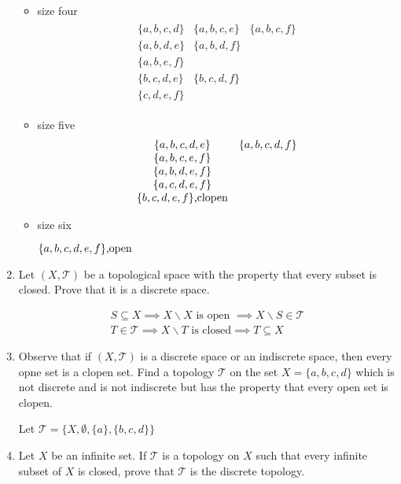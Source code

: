 \documentclass[10pt,a4paper]{report}
\newcommand{\TT}{\mathcal{T}}
\begin{document}
\begin{enumerate}
\begin{itemize}
	\item size four
	\begin{align*}
		\begin{array}{ccc}
			\{a,b,c,d\} & \{a,b,c,e\} & \{a,b,c,f\}\\
			\{a,b,d,e\} & \{a,b,d,f\}\\
			\{a,b,e,f\}\\
			\{b,c,d,e\} & \{b,c,d,f\}\\
			\{c,d,e,f\}
		\end{array}
	\end{align*}
	
	\item size five
	\begin{align*}
		\begin{array}{cc}
			\{a,b,c,d,e\} & \{a,b,c,d,f\} \\
			\{a,b,c,e,f\}\\
			\{a,b,d,e,f\}\\
			\{a,c,d,e,f\}\\
			\{b,c,d,e,f\}\text{,clopen}
		\end{array}
	\end{align*}
	
	\item size six
	
		$\{a,b,c,d,e,f\}\text{,open}$
\end{itemize}

\newpage
\item Let $(X,\TT)$ be a topological space with the property that every subset is closed.  Prove that it is a discrete space.

\begin{align*}
	S \subseteq X \implies X\backslash X \text{ is open } \implies X\backslash S \in \TT \\
	T \in \TT \implies X\backslash T \text{ is closed} \implies T \subseteq X
\end{align*}

\item Observe that if $(X,\TT)$ is a discrete space or an indiscrete space, then every opne set is a clopen set.  Find a topology $\TT$ on the set $X=\{a,b,c,d\}$ which is not discrete and is not indiscrete but has the property that every open set is clopen.

Let $\TT = \{X, \emptyset, \{a\}, \{b,c,d\}\}$

\item Let $X$ be an infinite set.  If $\TT$ is a topology on $X$ such that every infinite subset of $X$ is closed, prove that $\TT$ is the discrete topology.


\end{enumerate}
\end{document}

